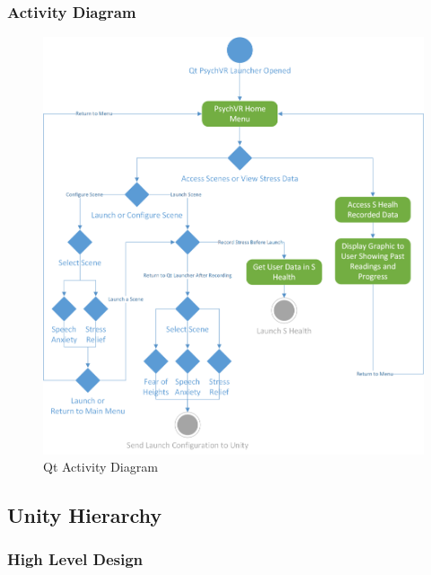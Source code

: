 \documentclass[a4paper,10pt,twoside]{article}
\begin{document}
		\subsubsection{Activity Diagram}
				\begin{figure}[H]
					\includegraphics[width=\linewidth,height=\paperheight,keepaspectratio]{qtActivityDiag.png}
					\caption{Qt Activity Diagram}
					\label{fig:qtactivity}
				\end{figure}
				\pagebreak
	\subsection{Unity Hierarchy}
		\subsubsection{High Level Design}
		\pagebreak
\end{document}
